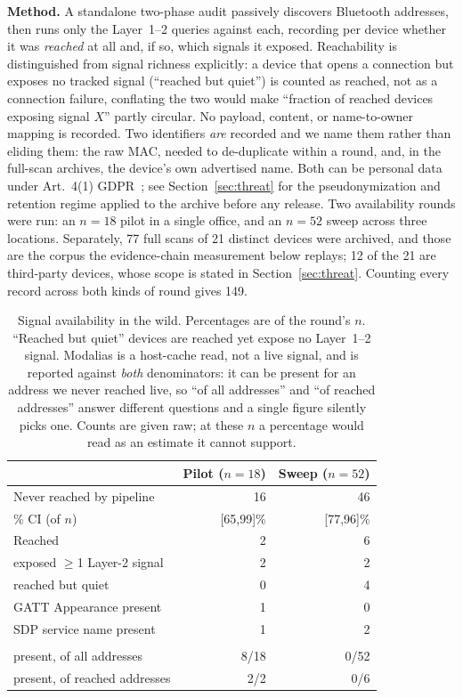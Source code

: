 \documentclass[conference]{IEEEtran}
\begin{document}
\textbf{Method.} A standalone two-phase audit passively discovers
Bluetooth addresses, then runs only the Layer~1--2 queries against each,
recording per device whether it was \emph{reached} at all and, if so,
which signals it exposed. Reachability is distinguished from signal
richness explicitly: a device that opens a connection but exposes no
tracked signal (``reached but quiet'') is counted as reached, not as a
connection failure, conflating the two would make ``fraction of reached
devices exposing signal $X$'' partly circular. No payload, content, or
name-to-owner mapping is recorded. Two identifiers \emph{are} recorded and
we name them rather than eliding them: the raw MAC, needed to de-duplicate
within a round, and, in the full-scan archives, the device's own advertised
name. Both can be personal data under Art.~4(1) GDPR~\cite{gdpr2016art4};
see Section~\ref{sec:threat} for the pseudonymization and retention regime
applied to the archive before any release. Two availability rounds were run: an $n{=}18$ pilot in a single office, and an
$n{=}52$ sweep across three locations. Separately, 77 full scans of 21 distinct
devices were archived, and those are the corpus the evidence-chain measurement
below replays; 12 of the 21 are third-party devices, whose scope is stated in
Section~\ref{sec:threat}. Counting every record across both kinds of round
gives 149.

\begin{table}[t]
\centering
\footnotesize
\setlength{\tabcolsep}{4pt}
\renewcommand{\arraystretch}{1.2}
\caption{Signal availability in the wild. Percentages are of the round's
$n$. ``Reached but quiet'' devices are reached yet expose no Layer~1--2
signal. Modalias is a host-cache read, not a live signal, and is reported
against \emph{both} denominators: it can be present for an address we never
reached live, so ``of all addresses'' and ``of reached addresses'' answer
different questions and a single figure silently picks one. Counts are given
raw; at these $n$ a percentage would read as an estimate it cannot support.}
\label{tab:avail}
\begin{tabular}{@{}>{\raggedright\arraybackslash}p{4.7cm} r r@{}}
\toprule
& \textbf{Pilot ($n{=}18$)} & \textbf{Sweep ($n{=}52$)} \\
\midrule
Never reached by pipeline & 16 & 46 \\
\quad 95\% CI (of $n$) & [65,99]\% & [77,96]\% \\
Reached & 2 & 6 \\
\quad exposed $\ge$1 Layer-2 signal & 2 & 2 \\
\quad reached but quiet & 0 & 4 \\
\midrule
GATT Appearance present & 1 & 0 \\
SDP service name present & 1 & 2 \\
\midrule
\multicolumn{3}{@{}l}{\emph{Modalias, both denominators}} \\
\quad present, of all addresses & 8/18 & 0/52 \\
\quad present, of reached addresses & 2/2 & 0/6 \\
\bottomrule
\end{tabular}
\end{table}
\end{document}
